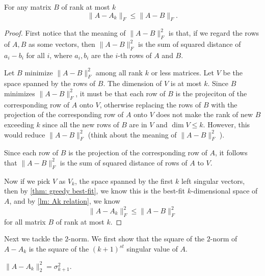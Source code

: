 \begin{theorem}
  For any matrix \(B\) of rank at most \(k\)
  \[
    \lVert A-A_k \rVert_F \leq \lVert A-B \rVert_F.  
  \]  
\end{theorem}
\begin{proof}
First notice that the meaning of \(\lVert A-B \rVert_F^2 \) is that, if we regard the rows of \(A,B\) as some vectors, then \(\lVert A-B \rVert_F^2 \) is the sum of squared distance of \(a_i - b_i\)  for all \(i\), where \(a_i,b_i\) are the \(i\)-th  rows of \(A\) and \(B\).       

  Let \(B\) minimize \(\lVert A-B \rVert_F^2 \) among all rank \(k\) or less matrices. Let \(V\) be the space spanned by the rows of \(B\). The dimension of \(V\) is at most \(k\). Since \(B\) minimizes \(\lVert A-B \rVert_F^2 \), it must be that each row of \(B\) is the projeciton of the corresponding row of \(A\) onto \(V\), otherwise replacing the rows of \(B\) with the projection of the corresponding row of \(A\) onto \(V\) does not make the rank of new \(B\) exceeding \(k\) since all the new rows of \(B\) are in \(V\) and \(\dim V \le k\). However, this would reduce \(\lVert A-B \rVert_F^2 \) (think about the meaning of \(\lVert A-B \rVert_F^2 \) ).
  
  Since each row of \(B\) is the projection of the corresponding row of \(A\), it follows that \(\lVert A-B \rVert_F^2 \) is the sum of squared distance of rows of \(A\) to \(V\).     

  Now if we pick \(V\) as \(V_k\), the space spanned by the first \(k\) left singular vectors, then by \autoref{thm: greedy best-fit}, we know this is the best-fit \(k\)-dimensional space of \(A\), and by \autoref{lm: Ak relation}, we know
  \[
    \lVert A-A_k \rVert_F^2 \le \lVert A-B \rVert_F^2  
  \] for all matrix \(B\) of rank at most \(k\).  
\end{proof}

Next we tackle the \(2\)-norm. We first show that the square of the \(2\)-norm of \(A-A_k\) is the square of the \((k+1)^{st} \) singular value of \(A\).

\begin{lemma}\label{lm:2norm A-Ak}
  \(\lVert A-A_k \rVert_2^2=\sigma _{k+1}^2 \). 
\end{lemma}

